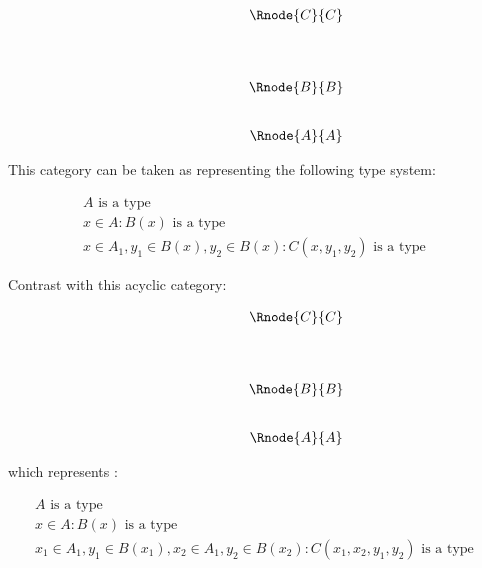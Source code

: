 \documentclass[10pt,a4paper]{scrartcl}
\begin{document}
\begin{center}
\begin{equation}
\begin{array}{p{1.5cm}cccp{2cm}c}
&                & \Rnode{C}{C}&   \\ [1.4cm]
&                & \Rnode{B}{B} &  \\ [0.8cm]
&                & \Rnode{A}{A} &  
\end{array}
\end{equation}
\setlength {\saroffsetA}{-2pt}
\setlength {\saroffsetB}{-2pt}
\sarreset
\end{center}

\noindent This category can be taken as representing the following type system:
\addtocounter{equation}{-1}
\begin{align}
&A\mbox{ is a type} && \tag*{(\theequation a)}\\
&x\in A: B(x) \mbox{ is a type} && \tag*{(\theequation b)}\\
&x\in A_1, y_1 \in B(x), y_2 \in B(x) : C(x,y_1,y_2) \mbox{ is a type} && \tag*{(\theequation c)}
\end{align}

\noindent
Contrast with this acyclic category:
\begin{center}
\begin{equation}
\begin{array}{p{1.5cm}cccp{2cm}c}
&                & \Rnode{C}{C}&   \\ [1.4cm]
&                & \Rnode{B}{B} &  \\ [0.8cm]
&                & \Rnode{A}{A} &  
\end{array}
\end{equation}
\setlength {\saroffsetA}{-2pt}
\setlength {\saroffsetB}{-2pt}
\setlength {\saroffsetA}{2pt}
\setlength {\saroffsetB}{2pt}
\sarreset
\end{center}
\noindent
which represents :
\addtocounter{equation}{-1}
\begin{align}
&A\mbox{ is a type} && \tag*{(\theequation a)}\\
&x\in A: B(x) \mbox{ is a type} && \tag*{(\theequation b)}\\
&x_1\in A_1, y_1 \in B(x_1), x_2\in A_1, y_2 \in B(x_2) : C(x_1,x_2,y_1,y_2) \mbox{ is a type} && \tag*{(\theequation c)}
\end{align}
\end{document}
